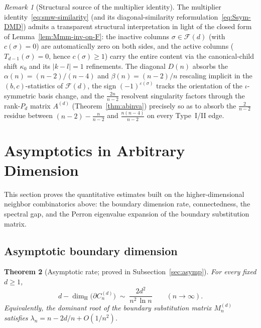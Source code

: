\documentclass{amsart}
\newtheorem{theorem}{Theorem}[section]
\theoremstyle{definition}
\theoremstyle{remark}
\newtheorem{remark}[theorem]{Remark}
\newcommand{\dH}{\dim_{\mathrm{H}}}
\begin{document}
\begin{remark}[Structural source of the multiplier identity]
\label{rem:smw-similarity-structure}
The multiplier identity~\eqref{eq:smw-similarity} (and its
diagonal-similarity reformulation~\eqref{eq:Ssym-DMD}) admits a
transparent structural interpretation in light of the
closed form of Lemma~\ref{lem:Mmm-inv-on-F}: the inactive
columns $\sigma \in \mathcal{F}(d)$ (with $c(\sigma) = 0$) are
automatically zero on both sides, and the active columns
($T_{d-1}(\sigma) = 0$, hence $c(\sigma) \ge 1$) carry the
entire content via the canonical-child shift $\kappa_0$ and its
$|k - l| = 1$ refinements.  The diagonal $D(n)$ absorbs the
$\alpha(n) = (n-2)/(n-4)$ and $\beta(n) = (n-2)/n$ rescaling
implicit in the $(b, c)$-statistics of $\mathcal{F}(d)$, the
sign $(-1)^{\varepsilon(\sigma)}$ tracks the orientation of the
$\iota$-symmetric basis change, and the $\frac{2n}{n-2}$
resolvent singularity factors through the rank-$P_d$ matrix
$A^{(d)}$ (Theorem~\ref{thm:abinva}) precisely so as to absorb
the $\frac{2}{n-2}$ residue between $(n-2) - \frac{n}{n-2}$ and
$\frac{n(n-4)}{n-2}$ on every Type~I/II edge.
\end{remark}

\section{Asymptotics in Arbitrary Dimension}
\label{sec:asymp-arbitrary-d}

This section proves the quantitative estimates built on the
higher-dimensional neighbor combinatorics above: the boundary
dimension rate, connectedness, the spectral gap, and the Perron
eigenvalue expansion of the boundary substitution matrix.

\subsection{Asymptotic boundary dimension}
\label{ssec:asymp-d-statement}

\begin{theorem}[Asymptotic rate; proved in Subsection~\ref{sec:asymp}]
\label{thm:asymp-d-forward}
For every fixed $d \ge 1$,
\begin{equation}\label{eq:asymp-d}
  d - \dH\bigl(\partial C_n^{(d)}\bigr)
  \;\sim\; \frac{2d^2}{n^2\,\ln n}
  \qquad (n \to \infty).
\end{equation}
Equivalently, the dominant root of the boundary substitution
matrix $M_n^{(d)}$ satisfies $\lambda_n = n - 2d/n + O(1/n^2)$.
\end{theorem}
\end{document}
